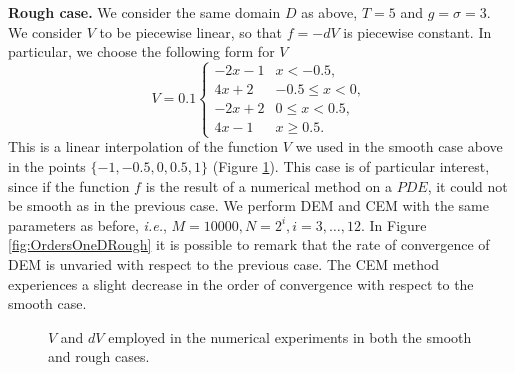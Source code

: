 \vspace{2mm}
\noindent\textbf{Rough case.} We consider the same domain $D$ as above, $T = 5$ and $g = \sigma = 3$. We consider $V$ to be piecewise linear, so that $f = -dV$ is piecewise constant. In particular, we choose the following form for $V$
\begin{equation}\label{eq:FunctionsOneDRough}
V = 0.1 
\begin{cases}
	 -2x -1 & x < -0.5, \\
	 4x + 2 & -0.5 \leq x < 0, \\
	 -2x + 2 &  0 \leq x < 0.5, \\
	 4x - 1 & x \geq 0.5.
\end{cases}
\end{equation}
This is a linear interpolation of the function $V$ we used in the smooth case above in the points $\{-1,-0.5,0,0.5,1\}$ (Figure \ref{fig:PlotsVSmoothRough}). This case is of particular interest, since if the function $f$ is the result of a numerical method on a $PDE$, it could not be smooth as in the previous case. We perform DEM and CEM with the same parameters as before, \textit{i.e.}, $M = 10000, N = 2^i,i=3,\dots,12$. In Figure \ref{fig:OrdersOneDRough} it is possible to remark that the rate of convergence of DEM is unvaried with respect to the previous case. The CEM method experiences a slight decrease in the order of convergence with respect to the smooth case.

\begin{figure}[t]
        \centering
        \resizebox{0.6\linewidth}{!}{ }  
        \caption{$V$ and $dV$ employed in the numerical experiments in both the smooth and rough cases.}
        \label{fig:PlotsVSmoothRough}
\end{figure}



